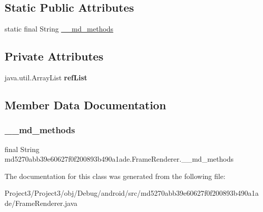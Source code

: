 \subsection*{Static Public Attributes}
\begin{DoxyCompactItemize}
\item 
static final String \hyperlink{classmd5270abb39e60627f0f200893b490a1ade_1_1FrameRenderer_ac9ef5c3ae0c3ecaad8abeb4649d6a402}{\+\_\+\+\_\+md\+\_\+methods}
\end{DoxyCompactItemize}
\subsection*{Private Attributes}
\begin{DoxyCompactItemize}
\item 
\mbox{\label{classmd5270abb39e60627f0f200893b490a1ade_1_1FrameRenderer_a5ed9d00ee3a9f50c03b3bde2a352e936}} 
java.\+util.\+Array\+List {\bfseries ref\+List}
\end{DoxyCompactItemize}


\subsection{Member Data Documentation}
\mbox{\label{classmd5270abb39e60627f0f200893b490a1ade_1_1FrameRenderer_ac9ef5c3ae0c3ecaad8abeb4649d6a402}} 
\subsubsection{\texorpdfstring{\+\_\+\+\_\+md\+\_\+methods}{\_\_md\_methods}}
{\footnotesize\ttfamily final String md5270abb39e60627f0f200893b490a1ade.\+Frame\+Renderer.\+\_\+\+\_\+md\+\_\+methods\hspace{0.3cm}{\ttfamily [static]}}



The documentation for this class was generated from the following file\+:\begin{DoxyCompactItemize}
\item 
Project3/\+Project3/obj/\+Debug/android/src/md5270abb39e60627f0f200893b490a1ade/Frame\+Renderer.\+java\end{DoxyCompactItemize}
